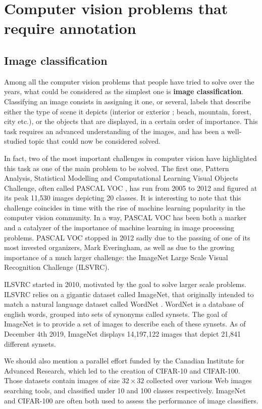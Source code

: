 \section{Computer vision problems that require annotation}
\label{sec:cv_annot} 

\subsection{Image classification} 
Among all the computer vision problems that people have tried to solve over the years, what could be considered as the simplest one is \textbf{image classification}. Classifying an image consists in assigning it one, or several, labels that describe either the type of scene it depicts (interior or exterior ; beach, mountain, forest, city etc.), or the objects that are displayed, in a certain order of importance. This task requires an advanced understanding of the images, and has been a well-studied topic that could now be considered solved. 

In fact, two of the most important challenges in computer vision have highlighted this task as one of the main problem to be solved. The first one, Pattern Analysis, Statistical Modelling and Computational Learning Visual Objects Challenge, often called PASCAL VOC \cite{Everingham10}, has run from 2005 to 2012 and figured at its peak 11,530 images depicting 20 classes. It is interesting to note that this challenge coincides in time with the rise of machine learning popularity in the computer vision community. In a way, PASCAL VOC has been both a marker and a catalyzer of the importance of machine learning in image processing problems. PASCAL VOC stopped in 2012 sadly due to the passing of one of its most invested organizers, Mark Everingham, as well as due to the growing importance of a much larger challenge: the ImageNet Large Scale Visual Recognition Challenge (ILSVRC).

ILSVRC \cite{ILSVRC15} started in 2010, motivated by the goal to solve larger scale problems. ILSVRC relies on a gigantic dataset called ImageNet, that originally intended to match a natural language dataset called WordNet \cite{miller1995wordnet}. WordNet is a database of english words, grouped into sets of synonyms called synsets. The goal of ImageNet is to provide a set of images to describe each of these synsets. As of December 4th 2019, ImageNet displays 14,197,122 images that depict 21,841 different synsets.

We should also mention a parallel effort funded by the Canadian Institute for Advanced Research, which led to the creation of CIFAR-10 and CIFAR-100. Those datasets contain images of size $32 \times 32$ collected over various Web images searching tools, and classified under 10 and 100 classes respectively. ImageNet and CIFAR-100 are often both used to assess the performance of image classifiers.

